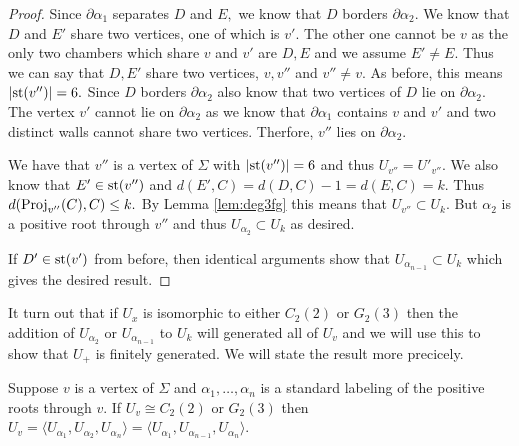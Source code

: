 \documentclass[class=book, crop=false]{standalone}
\begin{document}
\begin{proof}
	Since $\partial\alpha_1$ separates $D$ and $E,$ we know that $D$ borders $\partial \alpha_2.$ We know that $D$ and $E'$ share two vertices, one of which is $v'.$ The other one cannot be $v$ as the only two chambers which share $v$ and $v'$ are $D,E$ and we assume $E'\neq E.$ Thus we can say that $D,E'$ share two vertices, $v,v''$ and $v''\neq v.$ As before, this means $|\mathrm{st}(v'')|=6.$ Since $D$ borders $\partial \alpha_2$ also know that two vertices of $D$ lie on $\partial \alpha_2.$ The vertex $v'$ cannot lie on $\partial\alpha_2$ as we know that $\partial\alpha_1$ contains $v$ and $v'$ and two distinct walls cannot share two vertices. Therfore, $v''$ lies on $\partial \alpha_2.$ 

	We have that $v''$ is a vertex of $\Sigma$ with $|\mathrm{st}(v'')|=6$ and thus $U_{v''}=U'_{v''}.$ We also know that $E'\in \mathrm{st}(v'')$ and $d(E',C)=d(D,C)-1=d(E,C)=k.$ Thus $d(\mathrm{Proj}_{v''}(C),C)\le k.$ By Lemma \ref{lem:deg3fg} this means that $U_{v''}\subset U_k.$ But $\alpha_2$ is a positive root through $v''$ and thus $U_{\alpha_2}\subset U_k$ as desired.

	If $D'\in \mathrm{st}(v')$ from before, then identical arguments show that $U_{\alpha_{n-1}}\subset U_k$ which gives the desired result.
\end{proof}
It turn out that if $U_x$ is isomorphic to either $C_2(2)$ or $G_2(3)$ then the addition of $U_{\alpha_2}$ or $U_{\alpha_{n-1}}$ to $U_k$ will generated all of $U_v$ and we will use this to show that $U_+$ is finitely generated. We will state the result more precicely.
\begin{lemma}
\label{lem:exgen}	
Suppose $v$ is a vertex of $\Sigma$ and $\alpha_1,\dots,\alpha_n$ is a standard labeling of the positive roots through $v.$ If $U_v\cong C_2(2)$ or $G_2(3)$ then $U_v=\langle U_{\alpha_1},U_{\alpha_2},U_{\alpha_n}\rangle=\langle U_{\alpha_1},U_{\alpha_{n-1}},U_{\alpha_n}\rangle.$
\end{lemma}
\end{document}

